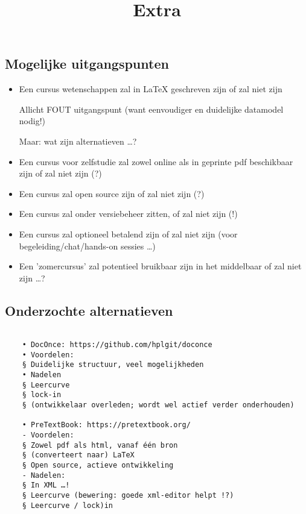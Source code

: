 \documentclass{ximera}
\title{Extra}
\begin{document}
\begin{abstract}
\end{abstract}
\maketitle

\subsection{Mogelijke uitgangspunten}

\begin{itemize}
	\item Een cursus wetenschappen zal in LaTeX geschreven zijn of zal niet zijn
	
	 Allicht FOUT uitgangspunt (want eenvoudiger en duidelijke datamodel nodig!)
	
	Maar: wat zijn alternatieven …?
	\item Een cursus voor zelfstudie zal zowel online als in geprinte pdf beschikbaar zijn of zal niet zijn (?)
	\item Een cursus zal open source zijn of zal niet zijn (?)
	\item Een cursus zal onder versiebeheer zitten, of zal niet zijn (!)
	\item Een cursus zal optioneel betalend zijn of zal niet zijn (voor begeleiding/chat/hands-on sessies …)
	\item Een 'zomercursus' zal potentieel bruikbaar zijn in het middelbaar of zal niet zijn …? 

\end{itemize}
\newpage
	
\subsection{Onderzochte alternatieven}

\begin{verbatim}

    • DocOnce: https://github.com/hplgit/doconce
    • Voordelen:
    § Duidelijke structuur, veel mogelijkheden
    • Nadelen
    § Leercurve 
    § lock-in
    § (ontwikkelaar overleden; wordt wel actief verder onderhouden)
    
    • PreTextBook: https://pretextbook.org/
    - Voordelen:
    § Zowel pdf als html, vanaf één bron
    § (converteert naar) LaTeX
    § Open source, actieve ontwikkeling
    - Nadelen:
    § In XML …!
    § Leercurve (bewering: goede xml-editor helpt !?)
    § Leercurve / lock)in
    \end{verbatim}
    
\end{document}
